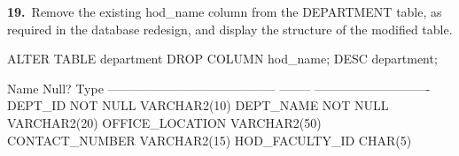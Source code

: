 
\noindent\begin{minipage}{\linewidth}
\begingroup{}
{\fontsize{14}{17}\selectfont\textbf{19.}}\ Remove the existing hod\_name column from the DEPARTMENT table, as required in the database redesign, and display the structure of the modified table.\par
\endgroup\vspace{12pt}


\begin{sqlcode}
ALTER TABLE department DROP COLUMN hod_name;
DESC department;
\end{sqlcode}

\vspace{18pt}


\begin{sqlout}
 Name                                      Null?    Type
 ----------------------------------------- -------- ----------------------------
 DEPT_ID                                   NOT NULL VARCHAR2(10)
 DEPT_NAME                                 NOT NULL VARCHAR2(20)
 OFFICE_LOCATION                                    VARCHAR2(50)
 CONTACT_NUMBER                                     VARCHAR2(15)
 HOD_FACULTY_ID                                     CHAR(5)
\end{sqlout}
\end{minipage}\par\vspace{30pt}

